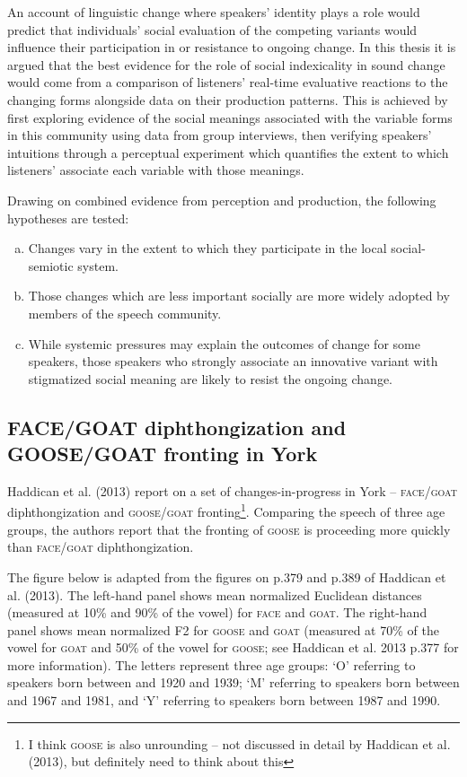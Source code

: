 \documentclass{article}
\begin{document}
An account of linguistic change where speakers' identity plays a role would predict that individuals' social evaluation of the competing variants would influence their participation in or resistance to ongoing change. In this thesis it is argued that the best evidence for the role of social indexicality in sound change would come from a comparison of listeners' real-time evaluative reactions to the changing forms alongside data on their production patterns. This is achieved by first exploring evidence of the social meanings associated with the variable forms in this community using data from group interviews, then verifying speakers' intuitions through a perceptual experiment which quantifies the extent to which listeners' associate each variable with those meanings. 

Drawing on combined evidence from perception and production, the following hypotheses are tested:
\begin{enumerate}[(a)]
\item{Changes vary in the extent to which they participate in the local social-semiotic system.}
\item{Those changes which are less important socially are more widely adopted by members of the speech community.}
\item{While systemic pressures may explain the outcomes of change for some speakers, those speakers who strongly associate an innovative variant with stigmatized social meaning are likely to resist the ongoing change.}
\end{enumerate}
\newpage
\subsection*{\textsc{FACE/GOAT} diphthongization and \textsc{GOOSE/GOAT} fronting in York}
Haddican et al. (2013) report on a set of changes-in-progress in York -- \textsc{face}/\textsc{goat} diphthongization and \textsc{goose}/\textsc{goat} fronting\footnote{I think \textsc{goose} is also unrounding -- not discussed in detail by Haddican et al. (2013), but definitely need to think about this}. Comparing the speech of three age groups, the authors report that the fronting of \textsc{goose} is proceeding more quickly than \textsc{face}/\textsc{goat} diphthongization. 

The figure below is adapted from the figures on p.379 and p.389 of Haddican et al. (2013). The left-hand panel shows mean normalized Euclidean distances (measured at 10\% and 90\% of the vowel) for \textsc{face} and \textsc{goat}. The right-hand panel shows mean normalized F2 for \textsc{goose} and \textsc{goat} (measured at 70\% of the vowel for \textsc{goat} and 50\% of the vowel for \textsc{goose}; see Haddican et al. 2013 p.377 for more information). The letters represent three age groups: `O' referring to speakers born between and 1920 and 1939; `M' referring to speakers born between and 1967 and 1981, and `Y' referring to speakers born between 1987 and 1990. 
\end{document}
